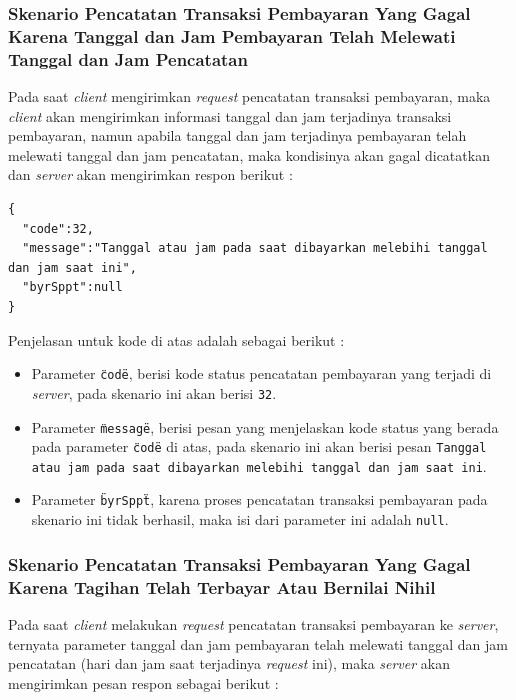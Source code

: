 \documentclass[pdftex,12pt, oneside]{article}
\begin{document}
  \subsubsection{Skenario Pencatatan Transaksi Pembayaran Yang Gagal Karena Tanggal dan Jam Pembayaran Telah Melewati Tanggal dan Jam Pencatatan}
  
  Pada saat \textit{client} mengirimkan \textit{request} pencatatan transaksi pembayaran, maka \textit{client} akan mengirimkan informasi tanggal dan jam terjadinya transaksi pembayaran, namun apabila tanggal dan jam terjadinya pembayaran telah melewati tanggal dan jam pencatatan, maka kondisinya akan gagal dicatatkan dan \textit{server} akan mengirimkan respon berikut :
  
  \begin{lstlisting}
{
  "code":32,
  "message":"Tanggal atau jam pada saat dibayarkan melebihi tanggal dan jam saat ini",
  "byrSppt":null
}
  \end{lstlisting}
  
  Penjelasan untuk kode di atas adalah sebagai berikut :
  
  \begin{itemize}
    \item Parameter \texttt{\"code\"}, berisi kode status pencatatan pembayaran yang terjadi di \textit{server}, pada skenario ini akan berisi \texttt{32}.
    \item Parameter \texttt{\"message\"}, berisi pesan yang menjelaskan kode status yang berada pada parameter \texttt{\"code\"} di atas, pada skenario ini akan berisi pesan \texttt{Tanggal atau jam pada saat dibayarkan melebihi tanggal dan jam saat ini}.
    \item Parameter \texttt{\"byrSppt\"}, karena proses pencatatan transaksi pembayaran pada skenario ini tidak berhasil, maka isi dari parameter ini adalah \texttt{null}.
  \end{itemize}
  
  \subsubsection{Skenario Pencatatan Transaksi Pembayaran Yang Gagal Karena Tagihan Telah Terbayar Atau Bernilai Nihil}
  
  Pada saat \textit{client} melakukan \textit{request} pencatatan transaksi pembayaran ke \textit{server}, ternyata parameter tanggal dan jam pembayaran telah melewati tanggal dan jam pencatatan (hari dan jam saat terjadinya \textit{request} ini), maka \textit{server} akan mengirimkan pesan respon sebagai berikut :
  
\end{document}
